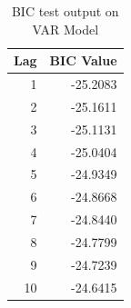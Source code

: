 \begin{table}[!ht] 
\centering 
\resizebox{0.2\textwidth}{!} { 
\begin{tabular}{rr}
\toprule
Lag & BIC Value \\
\midrule
1 & -25.2083 \\
2 & -25.1611 \\
3 & -25.1131 \\
4 & -25.0404 \\
5 & -24.9349 \\
6 & -24.8668 \\
7 & -24.8440 \\
8 & -24.7799 \\
9 & -24.7239 \\
10 & -24.6415 \\
\bottomrule
\end{tabular}} 
\caption {BIC test output on VAR Model} 
\label {var_bic} 
\end{table} 
\FloatBarrier